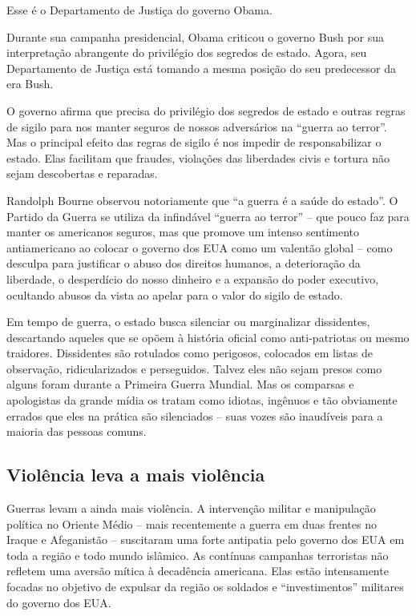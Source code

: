 Esse é o Departamento de Justiça do governo Obama.

Durante sua campanha presidencial, Obama criticou o governo Bush por sua interpretação abrangente do privilégio dos segredos de estado. Agora, seu Departamento de Justiça está tomando a mesma posição do seu predecessor da era Bush.

O governo afirma que precisa do privilégio dos segredos de estado e outras regras de sigilo para nos manter seguros de nossos adversários na ``guerra ao terror''. Mas o principal efeito das regras de sigilo é nos impedir de responsabilizar o estado. Elas facilitam que fraudes, violações das liberdades civis e tortura não sejam descobertas e reparadas.

Randolph Bourne observou notoriamente que ``a guerra é a saúde do estado''. O Partido da Guerra se utiliza da infindável ``guerra ao terror'' -- que pouco faz para manter os americanos seguros, mas que promove um intenso sentimento antiamericano ao colocar o governo dos EUA como um valentão global -- como desculpa para justificar o abuso dos direitos humanos, a deterioração da liberdade, o desperdício do nosso dinheiro e a expansão do poder executivo, ocultando abusos da vista ao apelar para o valor do sigilo de estado.

Em tempo de guerra, o estado busca silenciar ou marginalizar dissidentes, descartando aqueles que se opõem à história oficial como anti-patriotas ou mesmo traidores. Dissidentes são rotulados como perigosos, colocados em listas de observação, ridicularizados e perseguidos. Talvez eles não sejam presos como alguns foram durante a Primeira Guerra Mundial. Mas os comparsas e apologistas da grande mídia os tratam como idiotas, ingênuos e tão obviamente errados que eles na prática são silenciados -- suas vozes são inaudíveis para a maioria das pessoas comuns.

\subsection*{Violência leva a mais violência}

Guerras levam a ainda mais violência. A intervenção militar e manipulação política no Oriente Médio -- mais recentemente a guerra em duas frentes no Iraque e Afeganistão -- suscitaram uma forte antipatia pelo governo dos EUA em toda a região e todo mundo islâmico. As contínuas campanhas terroristas não refletem uma aversão mítica à decadência americana. Elas estão intensamente focadas no objetivo de expulsar da região os soldados e ``investimentos'' militares do governo dos EUA.

